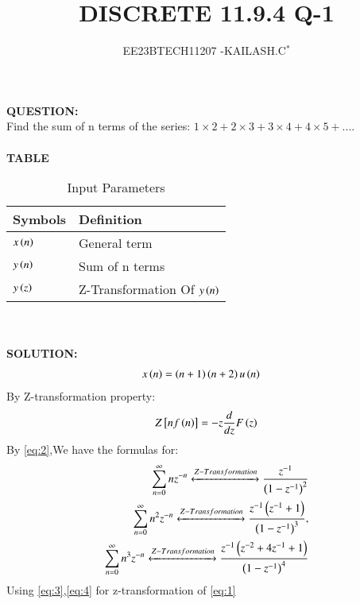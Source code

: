 \documentclass[journal,12pt,twocolumn]{IEEEtran}
\theoremstyle{remark}
\begin{document}

\vspace{3cm}

\title{DISCRETE 11.9.4 Q-1}
\author{EE23BTECH11207 -KAILASH.C$^{*}$%
}
\maketitle
\newpage
\bigskip

\renewcommand{\thefigure}{\theenumi}
\renewcommand{\thetable}{\theenumi}


\textbf{QUESTION:}\\
Find the sum of n terms of the series:
$1\times2+2\times3+3\times4+4\times5+....$\\ \\
\textbf{TABLE}\\
\begin{table}[h]
\begin{tabular}{|l|l|}
\hline
\textbf{Symbols} & \textbf{Definition}\\ \hline
$x\left(n\right)$ & General term \\ \hline
$y\left(n\right)$ & Sum of n terms \\ \hline
$y\left(z\right)$ & Z-Transformation Of $y\left(n\right)$\\ \hline
\end{tabular}
\caption{Input Parameters}
\label{Fig:1}
\end{table}\\ \\
\textbf{SOLUTION:}\\
\begin{align}
 x\left(n\right)&=\left(n+1\right)\left(n+2\right)u\left(n\right)   \label{eq:1}
\end{align}
By Z-transformation property:
\begin{align}
Z{}\left[nf\left(n\right)\right]=-z\frac{d}{dz}F\left(z\right)\label{eq:2}
\end{align}
By \eqref{eq:2},We have the formulas for:
\begin{align}
\sum_{n=0}^{\infty}nz^{-n}\xleftrightarrow[]{Z-Transformation} \frac{z^{-1}}{\left(1-z^{-1}\right)^2}\label{eq:3}\\
\sum_{n=0}^{\infty}n^2z^{-n}\xleftrightarrow[]{Z-Transformation}\frac{z^{-1}\left(z^{-1}+1\right)}{\left(1-z^{-1}\right)^3},\label{eq:4}\\
\sum_{n=0}^{\infty}n^3 z^{-n}\xleftrightarrow[]{Z-Transformation}\frac{z^{-1}\left(z^{-2}+4z^{-1}+1\right)}{\left(1-z^{-1}\right)^4}\label{eq:5}
\end{align}
Using \eqref{eq:3},\eqref{eq:4} for z-transformation of \eqref{eq:1}
\end{document}
